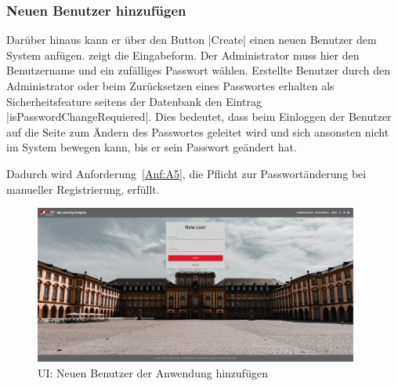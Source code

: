 \subsubsection*{Neuen Benutzer hinzufügen \faUsers}

Darüber hinaus kann er über den Button \jinline|Create| einen neuen Benutzer dem System anfügen. 
\abb {} zeigt die Eingabeform. 
Der Administrator muss hier den Benutzername und ein zufälliges Passwort wählen. 
Erstellte Benutzer durch den Administrator oder beim Zurücksetzen eines Passwortes erhalten als Sicherheitsfeature seitens der Datenbank  den Eintrag \jinline|isPasswordChangeRequiered|. 
Dies bedeutet, dass beim Einloggen der Benutzer auf die Seite zum Ändern des Passwortes geleitet wird und sich ansonsten nicht im System bewegen kann, bis er sein Passwort geändert hat. 

Dadurch wird Anforderung~\ref{Anf:A5}, die Pflicht zur Passwortänderung bei manueller Registrierung, erfüllt.

\begin{figure}[hp]
	\centering
	\includegraphics[width=0.95\textwidth, keepaspectratio]{img/client/AdminCreateUser.png}
	\captionsetup{justification=centering, format=plain}
	\caption[\acf{UI}: Neuen Benutzer der Anwendung hinzufügen]{\acf{UI}: Neuen Benutzer der Anwendung hinzufügen \\ \quelleScreenshot}
	\label{fig:AdminCreateUserImplement}
\end{figure}

